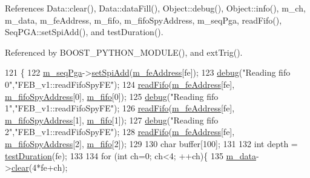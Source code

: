 References Data\+::clear(), Data\+::data\+Fill(), Object\+::debug(), Object\+::info(), m\+\_\+ch, m\+\_\+data, m\+\_\+fe\+Address, m\+\_\+fifo, m\+\_\+fifo\+Spy\+Address, m\+\_\+seq\+Pga, read\+Fifo(), Seq\+P\+G\+A\+::set\+Spi\+Add(), and test\+Duration().



Referenced by B\+O\+O\+S\+T\+\_\+\+P\+Y\+T\+H\+O\+N\+\_\+\+M\+O\+D\+U\+L\+E(), and ext\+Trig().


\begin{DoxyCode}
121                                              \{
122   \hyperlink{classFEB__v1_a6c7804ac86796f233a8393043adf2e77}{m\_seqPga}->\hyperlink{classSeqPGA_ac998ce3a6d9b5f2e88cc8393f8c1df53}{setSpiAdd}(\hyperlink{classFEB__v1_a4e1945c2d5b434125f375e9d0fc6d99f}{m\_feAddress}[fe]);
123   \hyperlink{classObject_aac010553f022165573714b7014a15f0d}{debug}(\textcolor{stringliteral}{"Reading fifo 0"},\textcolor{stringliteral}{"FEB\_v1::readFifoSpyFE"});
124   \hyperlink{classFEB__v1_af945f99a912c5ad076ebdb03dbb6c139}{readFifo}(\hyperlink{classFEB__v1_a4e1945c2d5b434125f375e9d0fc6d99f}{m\_feAddress}[fe], \hyperlink{classFEB__v1_a15b48648ba4534e732376b68bddc5d34}{m\_fifoSpyAddress}[0], 
      \hyperlink{classFEB__v1_ae5b770f2f5ffb97324862c93e3153985}{m\_fifo}[0]);
125   \hyperlink{classObject_aac010553f022165573714b7014a15f0d}{debug}(\textcolor{stringliteral}{"Reading fifo 1"},\textcolor{stringliteral}{"FEB\_v1::readFifoSpyFE"});
126   \hyperlink{classFEB__v1_af945f99a912c5ad076ebdb03dbb6c139}{readFifo}(\hyperlink{classFEB__v1_a4e1945c2d5b434125f375e9d0fc6d99f}{m\_feAddress}[fe], \hyperlink{classFEB__v1_a15b48648ba4534e732376b68bddc5d34}{m\_fifoSpyAddress}[1], 
      \hyperlink{classFEB__v1_ae5b770f2f5ffb97324862c93e3153985}{m\_fifo}[1]);
127   \hyperlink{classObject_aac010553f022165573714b7014a15f0d}{debug}(\textcolor{stringliteral}{"Reading fifo 2"},\textcolor{stringliteral}{"FEB\_v1::readFifoSpyFE"});
128   \hyperlink{classFEB__v1_af945f99a912c5ad076ebdb03dbb6c139}{readFifo}(\hyperlink{classFEB__v1_a4e1945c2d5b434125f375e9d0fc6d99f}{m\_feAddress}[fe], \hyperlink{classFEB__v1_a15b48648ba4534e732376b68bddc5d34}{m\_fifoSpyAddress}[2], 
      \hyperlink{classFEB__v1_ae5b770f2f5ffb97324862c93e3153985}{m\_fifo}[2]);
129   
130   \textcolor{keywordtype}{char} buffer[100];
131   
132   \textcolor{keywordtype}{int} depth = \hyperlink{classFEB__v1_a7f1db8ca9490172fce7603da9e703dec}{testDuration}(fe);
133 
134   \textcolor{keywordflow}{for} (\textcolor{keywordtype}{int} ch=0; ch<4; ++ch)\{
135     \hyperlink{classFEB__v1_a1c9dbc3660021dba1f58666d0097abb0}{m\_data}->\hyperlink{classData_acdda95480997a3d6245799810334739d}{clear}(4*fe+ch);

\end{DoxyCode}
